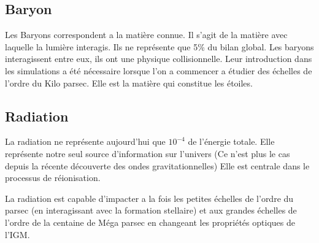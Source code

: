 %
%



\subsection{Baryon}

Les Baryons correspondent a la matière connue.
Il s'agit de la matière avec laquelle la lumière interagis.
Ils ne représente que 5\% du bilan global.
Les baryons interagissent entre eux, ils ont une physique collisionnelle.
Leur introduction dans les simulations a été nécessaire lorsque l'on a commencer a étudier des échelles de l'ordre du Kilo parsec.
Elle est la matière qui constitue les étoiles.



\subsection{Radiation}

La radiation ne représente aujourd'hui que $10^{-4}$ de l'énergie totale.
Elle représente notre seul source d'information sur l'univers (Ce n'est plus le cas depuis la récente découverte des ondes gravitationnelles) %
Elle est centrale dans le processus de réionisation.

La radiation est capable d'impacter a la fois les petites échelles de l'ordre du parsec (en interagissant avec la formation stellaire)
et aux grandes échelles de l'ordre de la centaine de Méga parsec en changeant les propriétés optiques de l'\ac{IGM}.




%


